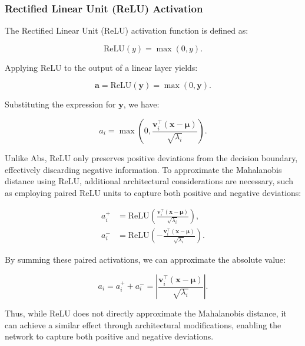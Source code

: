 \subsubsection{Rectified Linear Unit (ReLU) Activation}

The Rectified Linear Unit (ReLU) activation function is defined as:

\begin{equation}
\text{ReLU}(y) = \max(0, y).
\end{equation}

Applying ReLU to the output of a linear layer yields:

\begin{equation}
\mathbf{a} = \text{ReLU}(\mathbf{y}) = \max(0, \mathbf{y}).
\end{equation}

Substituting the expression for $\mathbf{y}$, we have:

\begin{equation}
a_i = \max\left(0, \frac{\mathbf{v}_i^\top (\mathbf{x} - \boldsymbol{\mu})}{\sqrt{\lambda_i}} \right).
\end{equation}

Unlike Abs, ReLU only preserves positive deviations from the decision boundary, effectively discarding negative information. To approximate the Mahalanobis distance using ReLU, additional architectural considerations are necessary, such as employing paired ReLU units to capture both positive and negative deviations:

\begin{align}
a_i^+ &= \text{ReLU}\left( \frac{\mathbf{v}_i^\top (\mathbf{x} - \boldsymbol{\mu})}{\sqrt{\lambda_i}} \right), \\
a_i^- &= \text{ReLU}\left( -\frac{\mathbf{v}_i^\top (\mathbf{x} - \boldsymbol{\mu})}{\sqrt{\lambda_i}} \right).
\end{align}

By summing these paired activations, we can approximate the absolute value:

\begin{equation}
a_i = a_i^+ + a_i^- = \left| \frac{\mathbf{v}_i^\top (\mathbf{x} - \boldsymbol{\mu})}{\sqrt{\lambda_i}} \right|.
\end{equation}

Thus, while ReLU does not directly approximate the Mahalanobis distance, it can achieve a similar effect through architectural modifications, enabling the network to capture both positive and negative deviations.

